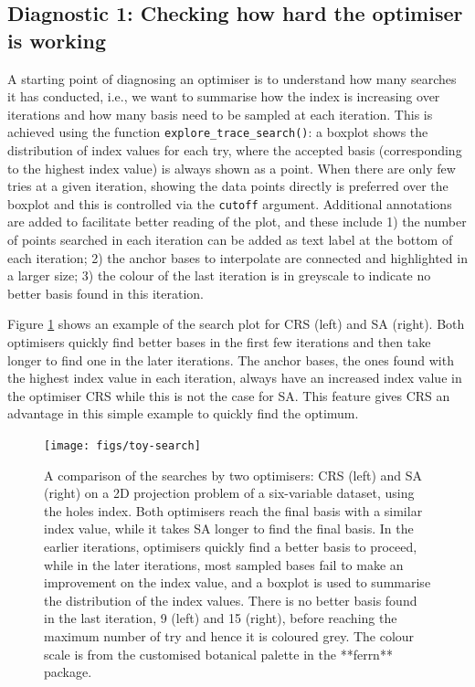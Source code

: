 \hypertarget{diagnostic-1-checking-how-hard-the-optimiser-is-working}{%
\subsection{Diagnostic 1: Checking how hard the optimiser is working}\label{diagnostic-1-checking-how-hard-the-optimiser-is-working}}

A starting point of diagnosing an optimiser is to understand how many searches it has conducted, i.e., we want to summarise how the index is increasing over iterations and how many basis need to be sampled at each iteration. This is achieved using the function \texttt{explore\_trace\_search()}: a boxplot shows the distribution of index values for each try, where the accepted basis (corresponding to the highest index value) is always shown as a point. When there are only few tries at a given iteration, showing the data points directly is preferred over the boxplot and this is controlled via the \texttt{cutoff} argument. Additional annotations are added to facilitate better reading of the plot, and these include 1) the number of points searched in each iteration can be added as text label at the bottom of each iteration; 2) the anchor bases to interpolate are connected and highlighted in a larger size; 3) the colour of the last iteration is in greyscale to indicate no better basis found in this iteration.

Figure \ref{fig:toy-search} shows an example of the search plot for CRS (left) and SA (right). Both optimisers quickly find better bases in the first few iterations and then take longer to find one in the later iterations. The anchor bases, the ones found with the highest index value in each iteration, always have an increased index value in the optimiser CRS while this is not the case for SA. This feature gives CRS an advantage in this simple example to quickly find the optimum.

\begin{figure}

{\centering \texttt{[image: figs/toy-search]} 

}

\caption{A comparison of the searches by two optimisers: CRS (left) and SA (right) on a 2D projection problem of a six-variable dataset,  using the holes index. Both optimisers reach the final basis with a similar index value, while it takes SA longer to find the final basis. In the earlier iterations, optimisers quickly find a better basis to proceed, while in the later iterations, most sampled bases fail to make an improvement on the index value, and a boxplot is used to summarise the distribution of the index values. There is no better basis found in the last iteration, 9 (left) and 15 (right), before reaching the maximum number of try and hence it is coloured grey. The colour scale is from the customised botanical palette in the **ferrn** package.}\label{fig:toy-search}
\end{figure}

